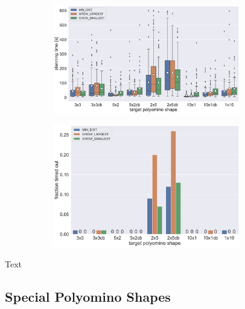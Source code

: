 \begin{figure}
	\centering
	\begin{subfigure}[b]{\textwidth}
		\centering
		\includegraphics[width=0.9\textwidth]{figures/plots/AFTS_cb_time.pdf}
		\caption{}
		\label{fig:AFTS_cb_time}
	\end{subfigure}
	
	\begin{subfigure}[b]{\textwidth}
		\centering
		\includegraphics[width=0.9\textwidth]{figures/plots/AFTS_cb_timeout.pdf}
		\caption{}
		\label{fig:AFTS_cb_timeout}
	\end{subfigure}
	\caption[]{}
	\label{fig:AFTS_cb_timestats}
\end{figure}

Text


\subsection{Special Polyomino Shapes}
\label{sec:special_poly}


